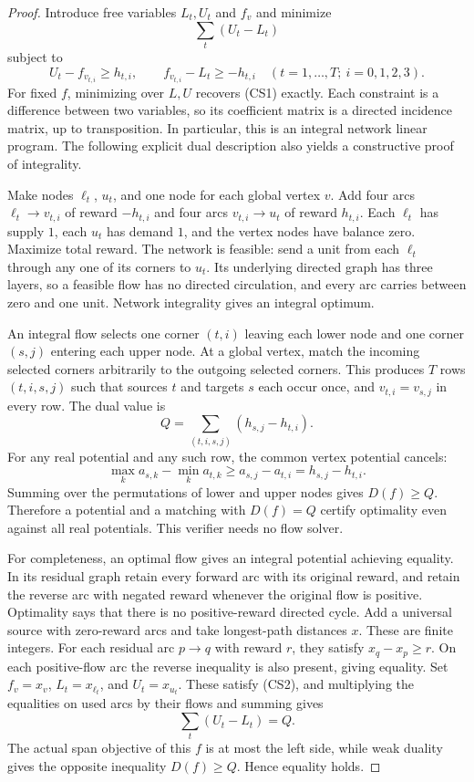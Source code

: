 \begin{proof}
Introduce free variables $L_t,U_t$ and $f_v$ and minimize
\[
 \sum_t(U_t-L_t)
\]
subject to
\[
 U_t-f_{v_{t,i}}\geq h_{t,i},\qquad
 f_{v_{t,i}}-L_t\geq-h_{t,i}
 \quad(t=1,\ldots,T;\ i=0,1,2,3).
 \tag{CS2}
\]
For fixed $f$, minimizing over $L,U$ recovers \textup{(CS1)} exactly.
Each constraint is a difference between two variables, so its coefficient
matrix is a directed incidence matrix, up to transposition. In particular,
this is an integral network linear program. The following explicit dual
description also yields a constructive proof of integrality.

Make nodes $\ell_t$, $u_t$, and one node for each global vertex $v$. Add
four arcs $\ell_t\to v_{t,i}$ of reward $-h_{t,i}$ and four arcs
$v_{t,i}\to u_t$ of reward $h_{t,i}$. Each $\ell_t$ has supply $1$, each
$u_t$ has demand $1$, and the vertex nodes have balance zero. Maximize
total reward. The network is feasible: send a unit from each $\ell_t$
through any one of its corners to $u_t$. Its underlying directed graph
has three layers, so a feasible flow has no directed circulation, and
every arc carries between zero and one unit. Network integrality gives an
integral optimum.

An integral flow selects one corner $(t,i)$ leaving each lower node and one
corner $(s,j)$ entering each upper node. At a global vertex, match the
incoming selected corners arbitrarily to the outgoing selected corners.
This produces $T$ rows $(t,i,s,j)$ such that sources $t$ and targets $s$
each occur once, and $v_{t,i}=v_{s,j}$ in every row. The dual value is
\[
 Q=\sum_{(t,i,s,j)}(h_{s,j}-h_{t,i}).
 \tag{CS3}
\]
For any real potential and any such row, the common vertex potential cancels:
\[
 \max_k a_{s,k}-\min_k a_{t,k}
 \geq a_{s,j}-a_{t,i}=h_{s,j}-h_{t,i}.
\]
Summing over the permutations of lower and upper nodes gives $D(f)\geq Q$.
Therefore a potential and a matching with $D(f)=Q$ certify optimality even
against all real potentials. This verifier needs no flow solver.

For completeness, an optimal flow gives an integral potential achieving
equality. In its residual graph retain every forward arc with its original
reward, and retain the reverse arc with negated reward whenever the original
flow is positive. Optimality says that there is no positive-reward directed
cycle. Add a universal source with zero-reward arcs and take longest-path
distances $x$. These are finite integers. For each residual arc $p\to q$
with reward $r$, they satisfy $x_q-x_p\geq r$. On each positive-flow arc
the reverse inequality is also present, giving equality. Set
$f_v=x_v$, $L_t=x_{\ell_t}$, and $U_t=x_{u_t}$. These satisfy
\textup{(CS2)}, and multiplying the equalities on used arcs by their flows
and summing gives
\[
 \sum_t(U_t-L_t)=Q.
\]
The actual span objective of this $f$ is at most the left side, while weak
duality gives the opposite inequality $D(f)\geq Q$. Hence equality holds.
\end{proof}

